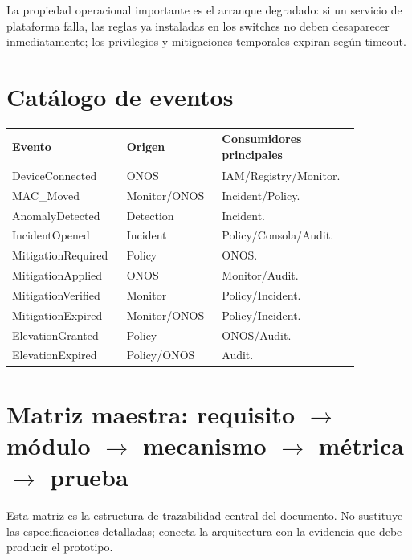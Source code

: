 \documentclass[11pt,a4paper]{article}
\begin{document}
La propiedad operacional importante es el arranque degradado: si un servicio de plataforma falla, las reglas ya instaladas en los switches no deben desaparecer inmediatamente; los privilegios y mitigaciones temporales expiran según timeout.

\section{Catálogo de eventos}

\begin{longtable}{p{0.29\linewidth}p{0.24\linewidth}p{0.33\linewidth}}
\toprule
Evento & Origen & Consumidores principales\\
\midrule
DeviceConnected & ONOS & IAM/Registry/Monitor.\\
MAC\_Moved & Monitor/ONOS & Incident/Policy.\\
AnomalyDetected & Detection & Incident.\\
IncidentOpened & Incident & Policy/Consola/Audit.\\
MitigationRequired & Policy & ONOS.\\
MitigationApplied & ONOS & Monitor/Audit.\\
MitigationVerified & Monitor & Policy/Incident.\\
MitigationExpired & Monitor/ONOS & Policy/Incident.\\
ElevationGranted & Policy & ONOS/Audit.\\
ElevationExpired & Policy/ONOS & Audit.\\
\bottomrule
\end{longtable}

\section{Matriz maestra: requisito \(\rightarrow\) módulo \(\rightarrow\) mecanismo \(\rightarrow\) métrica \(\rightarrow\) prueba}

Esta matriz es la estructura de trazabilidad central del documento. No sustituye las especificaciones detalladas; conecta la arquitectura con la evidencia que debe producir el prototipo.
\end{document}
